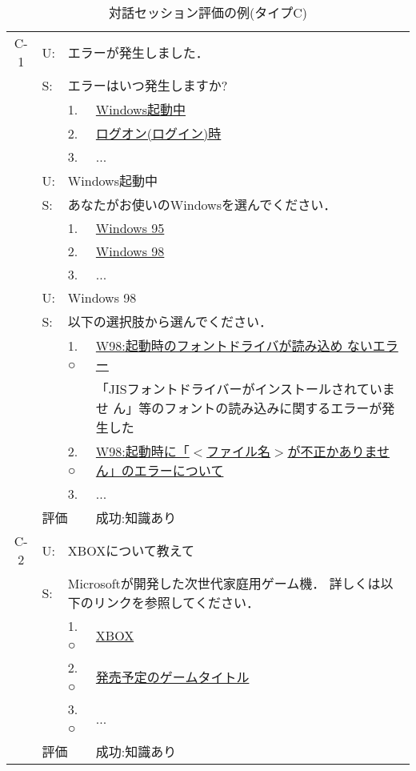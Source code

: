 \begin{table}
 \caption{対話セッション評価の例(タイプC)} \label{tab:対話セッション評価の例(タイプC)}
 \begin{center} \footnotesize
  \begin{tabular}{c|llp{10cm}} \hline
   C-1 & U: & \multicolumn{2}{l}{エラーが発生しました．} \\
       & S: & \multicolumn{2}{l}{エラーはいつ発生しますか?} \\
       &    & 1.    & \underline{Windows起動中} \\
       &    & 2.    & \underline{ログオン(ログイン)時} \\
       &    & 3.    & ... \\
       & U: & \multicolumn{2}{l}{Windows起動中} \\
       & S: & \multicolumn{2}{l}{あなたがお使いのWindowsを選んでください．}\\
       &    & 1.    & \underline{Windows 95} \\
       &    & 2.    & \underline{Windows 98} \\
       &    & 3.    & ... \\
       & U: & \multicolumn{2}{l}{Windows 98} \\
       & S: & \multicolumn{2}{l}{以下の選択肢から選んでください．} \\
       &    & 1. ○ & \underline{W98:起動時のフォントドライバが読み込め
       ないエラー} \\
       &    &       & 「JISフォントドライバーがインストールされていませ
       ん」等のフォントの読み込みに関するエラーが発生した \\
       &    & 2. ○ & \underline{W98:起動時に「$<$ファイル名$>$が不正かありません」のエラーについて} \\
       &    & 3.    & ... \\ \cline{2-4}
       & \multicolumn{2}{l}{評価} & 成功:知識あり \\ \hline

   C-2 & U: & \multicolumn{2}{l}{XBOXについて教えて} \\
       & S: & \multicolumn{2}{l}{Microsoftが開発した次世代家庭用ゲーム機．
       詳しくは以下のリンクを参照してください．} \\
       &    & 1. ○ & \underline{XBOX} \\
       &    & 2. ○ & \underline{発売予定のゲームタイトル} \\
       &    & 3. ○ & ... \\  \cline{2-4}
       & \multicolumn{2}{l}{評価} & 成功:知識あり \\ \hline

  \end{tabular}

 \end{center}
\end{table}




